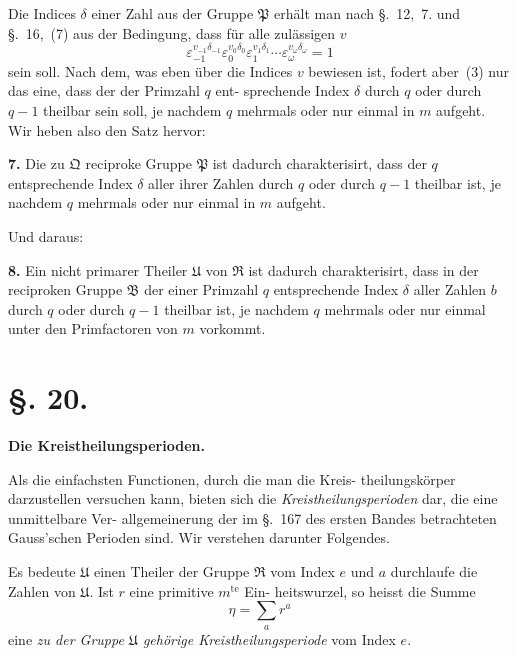 \documentclass[12pt,a4paper]{article}
\theoremstyle{plain}
\theoremstyle{definition}
\theoremstyle{remark}
\begin{document}
Die Indices $\delta$ einer Zahl aus der Gruppe $\mathfrak{P}$ erhält man
nach \S.~12,~7. und \S.~16,~(7) aus der Bedingung, dass für alle
zulässigen $v$
\begin{equation}\tag{3}
\varepsilon_{-1}^{v_{-1}\delta_{-1}} \varepsilon_0^{v_0\delta_0} \varepsilon_1^{v_1\delta_1} \cdots \varepsilon_\omega^{v_\omega\delta_\omega} = 1
\end{equation}
sein soll. Nach dem, was eben über die Indices $v$ bewiesen ist,
fodert aber~(3) nur das eine, dass der der Primzahl $q$ ent-
sprechende Index $\delta$ durch $q$ oder durch $q-1$ theilbar sein
soll, je nachdem $q$ mehrmals oder nur einmal in $m$ aufgeht. Wir
heben also den Satz hervor:

\textbf{7.} Die zu $\mathfrak{Q}$ reciproke Gruppe $\mathfrak{P}$ ist dadurch
charakterisirt, dass der $q$ entsprechende Index $\delta$
aller ihrer Zahlen durch $q$ oder durch $q-1$
theilbar ist, je nachdem $q$ mehrmals oder nur
einmal in $m$ aufgeht.

Und daraus:

\textbf{8.} Ein nicht primarer Theiler $\mathfrak{U}$ von $\mathfrak{R}$ ist dadurch
charakterisirt, dass in der reciproken Gruppe $\mathfrak{B}$
der einer Primzahl $q$ entsprechende Index
$\delta$ aller Zahlen $b$ durch $q$ oder durch $q-1$ theilbar
ist, je nachdem $q$ mehrmals oder nur einmal
unter den Primfactoren von $m$ vorkommt.


\section*{\S. 20.}
\begin{center}
\textbf{Die Kreistheilungsperioden.}
\end{center}

Als die einfachsten Functionen, durch die man die Kreis-
theilungskörper darzustellen versuchen kann, bieten sich die
\emph{Kreistheilungsperioden} dar, die eine unmittelbare Ver-
allgemeinerung der im \S.~167 des ersten Bandes betrachteten
Gauss'schen Perioden sind. Wir verstehen darunter Folgendes.

Es bedeute $\mathfrak{U}$ einen Theiler der Gruppe $\mathfrak{R}$ vom Index $e$ und
$a$ durchlaufe die Zahlen von $\mathfrak{U}$. Ist $r$ eine primitive $m^{\text{te}}$ Ein-
heitswurzel, so heisst die Summe
\begin{equation}\tag{1}
\eta = \sum_a r^a
\end{equation}
eine \emph{zu der Gruppe $\mathfrak{U}$ gehörige Kreistheilungsperiode}
vom Index $e$.
\end{document}
